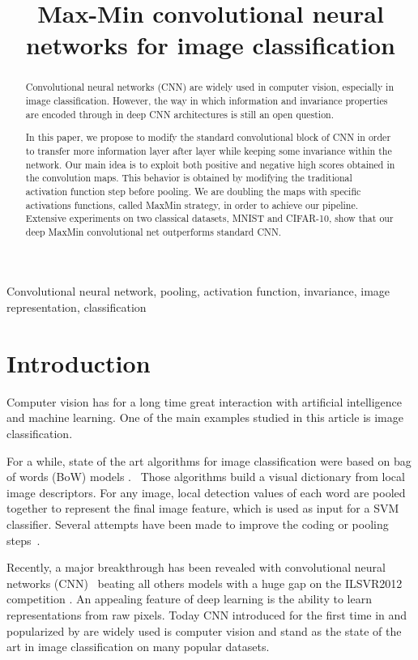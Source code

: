 \documentclass{article}
\title{Max-Min convolutional neural networks for image classification}
\begin{document}
\maketitle
\begin{abstract}
Convolutional neural networks (CNN) are widely used in computer vision, especially in image classification. 
However, the way in which information and invariance properties are encoded through in deep CNN architectures is still an open question.

 In this paper, we propose to modify the standard convolutional block of CNN in order to transfer more information layer after layer while keeping some invariance within the network. Our main idea is to exploit both positive and negative high scores obtained in the convolution maps. This behavior is obtained by modifying the traditional activation function step before pooling. We are doubling the maps with specific activations functions, called MaxMin strategy, in order to achieve our pipeline. Extensive experiments on two classical datasets, MNIST and CIFAR-10, show that our deep MaxMin convolutional net outperforms standard CNN.
\end{abstract}
\begin{keywords}
Convolutional neural network, pooling, activation function, invariance, image representation, classification
\end{keywords}
\section{Introduction}
\label{sec:intro}

Computer vision has for a long time great interaction with artificial intelligence and machine learning. One of the main examples studied in this article is image classification.  

For a while, state of the art algorithms for image classification were based on bag of words (BoW) models \cite{bow1} \cite{bow2}.
~Those algorithms build a visual dictionary from local image descriptors. For any image, local detection values of each word are pooled together to represent the final image feature, which is used as input for a SVM \cite{svm} classifier.
Several attempts have been made to improve the coding or pooling steps~\cite{DBLP:conf/cvpr/PerronninD07,Goh_NIPS13,GohTNNLS14,avilaCVIU2013}.

Recently, a major breakthrough has been revealed with convolutional neural networks (CNN)~\cite{alexnet} beating all others models with a huge gap on the ILSVR2012 competition \cite{lsvrc2012}. 
An appealing feature of deep learning is the ability to learn representations from raw pixels. 
Today CNN introduced for the first time in \cite{convnet1} and popularized by \cite{convnet2} are widely 
used is computer vision and stand as the state of the art in image classification on many popular datasets. 
\end{document}
